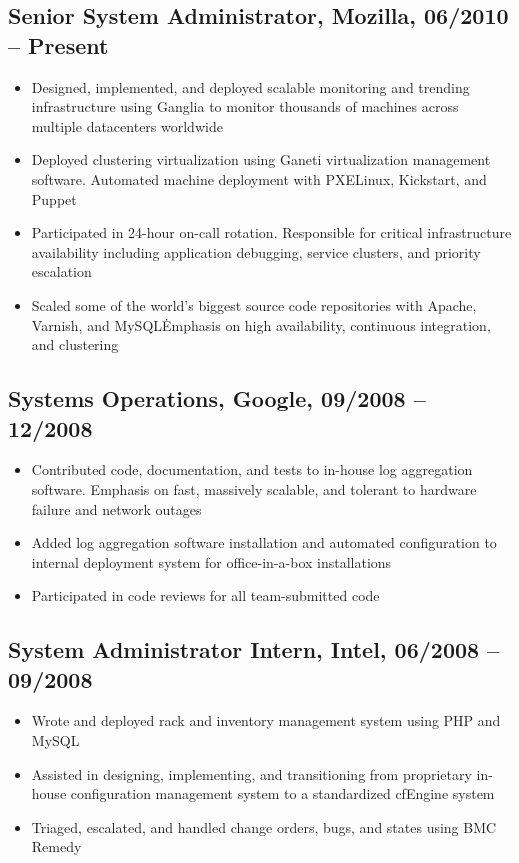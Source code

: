 \documentclass[a4paper,12pt]{report}
\begin{document}
\subsection*{Senior System Administrator, Mozilla, 06/2010 -- Present}
\begin{itemize} \itemsep -0.25em
\item Designed, implemented, and deployed scalable monitoring and trending infrastructure using Ganglia to monitor thousands of machines across multiple datacenters worldwide
\item Deployed clustering virtualization using Ganeti virtualization management software. Automated machine deployment with PXELinux, Kickstart, and Puppet
\item Participated in 24-hour on-call rotation. Responsible for critical infrastructure availability including application debugging, service clusters, and priority escalation
\item Scaled some of the world's biggest source code repositories with Apache, Varnish, and MySQL\. Emphasis on high availability, continuous integration, and clustering
\end{itemize}

\subsection*{Systems Operations, Google, 09/2008 -- 12/2008}
\begin{itemize} \itemsep -0.25em
\item Contributed code, documentation, and tests to in-house log aggregation software. Emphasis on fast, massively scalable, and tolerant to hardware failure and network outages
\item Added log aggregation software installation and automated configuration to internal deployment system for office-in-a-box installations
\item Participated in code reviews for all team-submitted code
\end{itemize}

\subsection*{System Administrator Intern, Intel, 06/2008 -- 09/2008}
\begin{itemize} \itemsep -0.25em
\item Wrote and deployed rack and inventory management system using PHP and MySQL
\item Assisted in designing, implementing, and transitioning from proprietary in-house configuration management system to a standardized cfEngine system
\item Triaged, escalated, and handled change orders, bugs, and states using BMC Remedy
\end{itemize}
\end{document}
